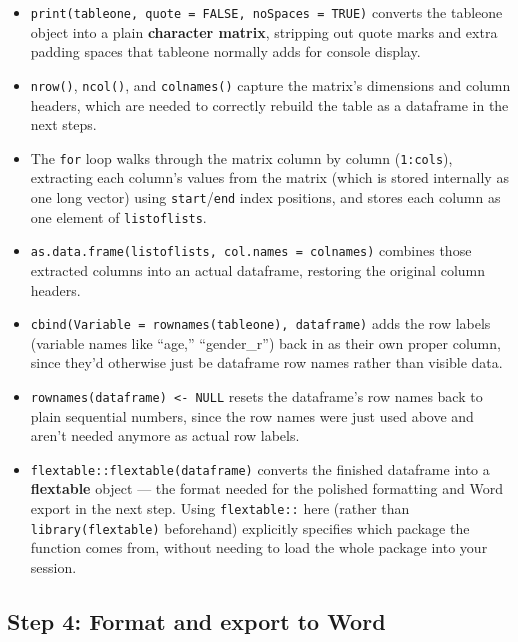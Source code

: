 \documentclass[
  letterpaper,
  DIV=11,
  numbers=noendperiod]{scrreprt}
\begin{document}
\begin{itemize}
\item
  \texttt{print(tableone,\ quote\ =\ FALSE,\ noSpaces\ =\ TRUE)}
  converts the tableone object into a plain \textbf{character matrix},
  stripping out quote marks and extra padding spaces that tableone
  normally adds for console display.
\item
  \texttt{nrow()}, \texttt{ncol()}, and \texttt{colnames()} capture the
  matrix's dimensions and column headers, which are needed to correctly
  rebuild the table as a dataframe in the next steps.
\item
  The \texttt{for} loop walks through the matrix column by column
  (\texttt{1:cols}), extracting each column's values from the matrix
  (which is stored internally as one long vector) using
  \texttt{start}/\texttt{end} index positions, and stores each column as
  one element of \texttt{listoflists}.
\item
  \texttt{as.data.frame(listoflists,\ col.names\ =\ colnames)} combines
  those extracted columns into an actual dataframe, restoring the
  original column headers.
\item
  \texttt{cbind(Variable\ =\ rownames(tableone),\ dataframe)} adds the
  row labels (variable names like ``age,'' ``gender\_r'') back in as
  their own proper column, since they'd otherwise just be dataframe row
  names rather than visible data.
\item
  \texttt{rownames(dataframe)\ \textless{}-\ NULL} resets the
  dataframe's row names back to plain sequential numbers, since the row
  names were just used above and aren't needed anymore as actual row
  labels.
\item
  \texttt{flextable::flextable(dataframe)} converts the finished
  dataframe into a \textbf{flextable} object --- the format needed for
  the polished formatting and Word export in the next step. Using
  \texttt{flextable::} here (rather than \texttt{library(flextable)}
  beforehand) explicitly specifies which package the function comes
  from, without needing to load the whole package into your session.
\end{itemize}

\subsection{Step 4: Format and export to
Word}\label{step-4-format-and-export-to-word}
\end{document}
